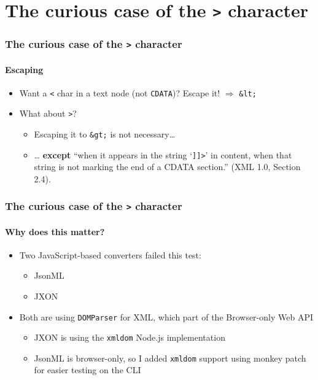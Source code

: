 \documentclass[
    alternativetitlepage=alternativ,
    cornerlogo=hgi_nds_logo2,
    sectionoverview,
]{rubpresentation}
\begin{document}
\section{The curious case of the \texttt{>} character}

\begin{frame}
    \frametitle{The curious case of the \texttt{>} character}
    \framesubtitle{Escaping}
    \begin{itemize}
        \item{} Want a \texttt{<} char in a text node (not \texttt{CDATA})? Escape it! $\Rightarrow$ \texttt{\&lt;}
        \item{} What about \texttt{>}?
        \begin{itemize}
            \item{} Escaping it to \texttt{\&gt;} is not necessary\dots{}
            \item{} \dots{} \textbf{except} \enquote{when it appears in the string \enquote{\texttt{]]>}} in content, when that string is not marking the end of a CDATA section.} (XML 1.0, Section 2.4).
        \end{itemize}
    \end{itemize}
\end{frame}

\begin{frame}[fragile]
    \frametitle{The curious case of the \texttt{>} character}
    \framesubtitle{Why does this matter?}
    \begin{itemize}
        \item{} Two JavaScript-based converters failed this test:
        \begin{itemize}
            \item{} JsonML
            \item{} JXON
        \end{itemize}
        \item{} Both are using \texttt{DOMParser} for XML, which part of the Browser-only Web API
        \begin{itemize}
            \item{} JXON is using the \texttt{xmldom} Node.js implementation
            \item{} JsonML is browser-only, so I added \texttt{xmldom} support using monkey patch for easier testing on the CLI
        \end{itemize}
    \end{itemize}
\end{frame}
\end{document}
